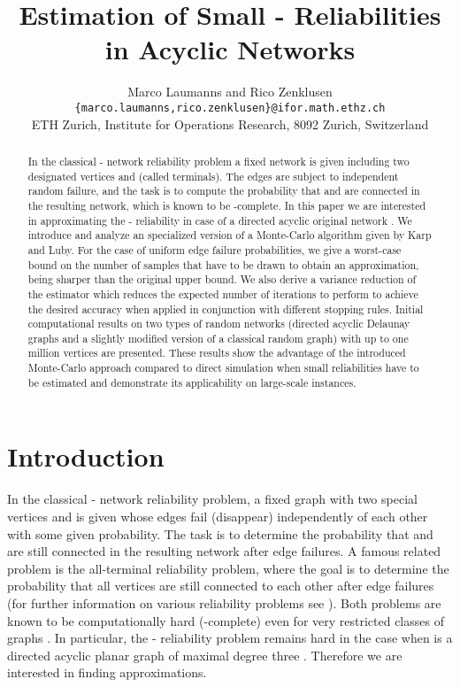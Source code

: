 \documentclass{article}
\begin{document}
\title{Estimation of Small - Reliabilities in Acyclic Networks}
\author{Marco Laumanns and Rico Zenklusen \\
\small\texttt{\{marco.laumanns,rico.zenklusen\}@ifor.math.ethz.ch}\\
\small ETH Zurich, Institute for Operations Research, 8092 Zurich, Switzerland
}

\maketitle


\begin{abstract}
In the classical - network reliability
problem a fixed network  is given including two designated
vertices  and  (called terminals). The edges are
subject to independent random failure, and the task is to compute
the probability that  and  are connected in
the resulting network, which is known to be -complete.
In this paper we are interested in approximating the -
reliability in case of a directed acyclic original
network . We introduce and analyze an
specialized version of a Monte-Carlo algorithm given
by Karp and Luby. 
For the case of uniform edge failure probabilities, we
give a \mbox{worst-case} bound on the number of samples that
have to be drawn to obtain an  approximation,
being sharper than the original upper bound.
We also derive a variance reduction of the
estimator which reduces the expected number of iterations
to perform to achieve the desired accuracy when
applied in conjunction with different stopping rules.
Initial computational results on two types of random networks
(directed acyclic Delaunay graphs and a slightly modified version
of a classical random graph) with up to one million vertices are presented.
These results show the advantage of the introduced Monte-Carlo approach compared
to direct simulation when small reliabilities have to
be estimated and demonstrate its applicability on \mbox{large-scale}
instances.

\end{abstract}


\section{Introduction}
In the classical - network reliability problem, a
fixed graph  with two special vertices  and 
 is given whose edges fail (disappear) independently of
each other with some given probability. The task is to
determine the probability that  and  are still
connected in the resulting network after edge failures. A
famous related problem is the all-terminal reliability
problem, where the goal is to determine the probability that
all vertices are still connected to each other after edge
failures (for further information on various reliability
problems see  \cite{colbourn_1987_combinatorics}).
Both problems are known to be computationally hard
(-complete) even for very restricted classes of graphs 
\cite{valiant_1979_complexity,provan_1983_complexity}.
In particular, the - reliability problem
remains hard in the case when  is a directed acyclic planar graph of maximal degree
three \cite{provan_1986_complexity}. Therefore we are interested in finding
approximations.
\end{document}
